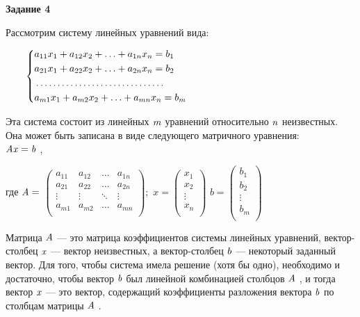 \documentclass{article}
\begin{document}
{\bf Задание 4}

Рассмотрим систему линейных уравнений вида:
\\
\par$\qquad
\left\{\begin{aligned}
& a_{11}x_1 + a_{12}x_2 + \ldots + a_{1n}x_n=b_1\\
& a_{21}x_1 + a_{22}x_2 + \ldots + a_{2n}x_n=b_2\\
&\ldots \ldots \ldots \ldots \ldots \ldots \ldots \ldots \ldots \ldots \\
& a_{m1}x_1 + a_{m2}x_2 + \ldots + a_{mn}x_n=b_m\\
\end{aligned}\right .\\
$

Эта система состоит из линейных $\mathrm{\it m}$ уравнений относительно $\mathrm{\it n}$ неизвестных.
Она может быть записана в виде следующего матричного уравнения:
\\
$\mathrm{\it {\Large A} x = b}$ 
,

где $\mathrm{\it \Large A =}$ 
$\left(\begin{matrix}
a_{11} & a_{12} & \ldots & a_{1n}\\
a_{21} & a_{22} & \ldots & a_{2n}\\
\vdots & \vdots & \ddots & \vdots\\
a_{m1} & a_{m2} & \ldots & a_{mn}\\
\end{matrix}\right);
$
$x=
\left(\begin{matrix}
x_1 \\
x_2 \\
\vdots \\
x_n \\
\end{matrix}\right)
$
$b=
\left(\begin{matrix}
b_1\\
b_2\\
\vdots\\
b_m\\
\end{matrix}\right)
$


Матрица ${\it A}$ — это матрица коэффициентов системы линейных уравнений,
вектор-столбец ${\it x}$ — вектор неизвестных, а вектор-столбец ${\it b}$ — некоторый
заданный вектор.
Для того, чтобы система имела решение (хотя бы одно), необходимо и
достаточно, чтобы вектор ${\it b}$ был линейной комбинацией столбцов ${\it \Large A}$ , и тогда
вектор ${\it x}$ — это вектор, содержащий коэффициенты разложения вектора ${\it b}$ по
столбцам матрицы ${\it \Large A}$ .
\end{document}
